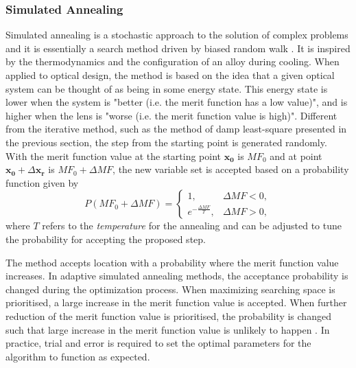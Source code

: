 \subsubsection{Simulated Annealing}
Simulated annealing is a stochastic approach to the solution of complex problems and it is essentially a search method driven by biased random walk \cite{WELLER:87}. It is inspired by the thermodynamics and the configuration of an alloy during cooling. When applied to optical design, the method is based on the idea that a given optical system can be thought of as being in some energy state. This energy state is lower when the system is "better (i.e. the merit function has a low value)", and is higher when the lens is "worse (i.e. the merit function value is high)". Different from the iterative method, such as the method of damp least-square presented in the previous section, the step from the starting point is generated randomly. With the merit function value at the starting point $\pmb{x_0}$ is $MF_0$ and at point $\pmb{x_0} + \Delta\pmb{x_r}$ is $MF_0 + \Delta MF$, the new variable set is accepted based on a probability function \cite{Forbes1991} given by 
\begin{equation} \label{eq: simualted_annealing_probability }
P(MF_0 + \Delta MF) = 
\begin{cases}
  1, & \Delta MF < 0, \\ 
 e^{-\frac{\Delta MF}{T}}, & \Delta MF > 0,
\end{cases}
\end{equation}where $T$ refers to the \textit{temperature} for the annealing and can be adjusted to tune the probability for accepting the proposed step. 

The method accepts location with a probability where the merit function value increases. In adaptive simulated annealing methods, the acceptance probability is changed during the optimization process. When maximizing searching space is prioritised, a large increase in the merit function value is accepted. When further reduction of the merit function value is prioritised, the probability is changed such that large increase in the merit function value is unlikely to happen \cite{Forbes1991}. In practice, trial and error is required to set the optimal parameters for the algorithm to function as expected.    

